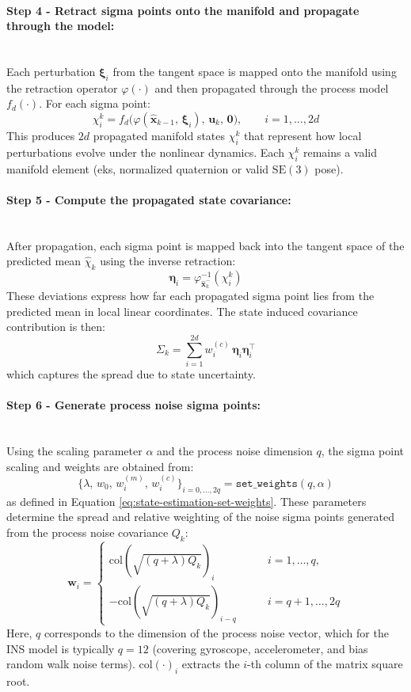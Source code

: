 \paragraph{Step 4 - Retract sigma points onto the manifold and propagate through the model:} \mbox{}\\[0.5em] \noindent
Each perturbation $\boldsymbol{\xi}_i$ from the tangent space is mapped onto the manifold using the retraction operator $\varphi(\cdot)$ and then propagated through the process model $f_d(\cdot)$. For each sigma point:
$$
    \chi_i^{k} = f_d\big(\varphi(\hat{\mathbf{x}}_{k-1},\, \boldsymbol{\xi}_i),\, \mathbf{u}_k,\, \mathbf{0}\big),\qquad i = 1,\ldots,2d
$$
This produces $2d$ propagated manifold states $\chi_i^k$ that represent how local perturbations evolve under the nonlinear dynamics. Each $\chi_i^k$ remains a valid manifold element (eks, normalized quaternion or valid $\mathrm{SE}(3)$ pose).

\paragraph{Step 5 - Compute the propagated state covariance:} \mbox{}\\[0.5em] \noindent
After propagation, each sigma point is mapped back into the tangent space of the predicted mean $\hat{\chi}_k$ using the inverse retraction:
$$
    \boldsymbol{\eta}_i = \varphi^{-1}_{\hat{\mathbf{x}}_{k}^{-}}(\chi_i^k)
$$
These deviations express how far each propagated sigma point lies from the predicted mean in local linear coordinates. The state induced covariance contribution is then:
$$
    \Sigma_k = \sum_{i=1}^{2d} w_i^{(c)}\, \boldsymbol{\eta}_i \boldsymbol{\eta}_i^\top
$$
which captures the spread due to state uncertainty.

\paragraph{Step 6 - Generate process noise sigma points:} \mbox{}\\[0.5em] \noindent
Using the scaling parameter $\alpha$ and the process noise dimension $q$, the sigma point scaling and weights are obtained from:
$$
    \{\lambda,\, w_0,\, w_i^{(m)},\, w_i^{(c)}\}_{i=0,\ldots,2q} = \mathtt{set\_weights}(q, \alpha)
$$
as defined in Equation \ref{eq:state-estimation-set-weights}. These parameters determine the spread and relative weighting of the noise sigma points generated from the process noise covariance $Q_k$:
$$
    \mathbf{w}_i = 
    \begin{cases}
        \text{col}\left(\sqrt{(q+\lambda)Q_k}\right)_i \qquad &i = 1,\ldots,q, \\
        -\text{col}\left(\sqrt{(q+\lambda)Q_k}\right)_{i-q} \qquad &i = q+1,\ldots,2q
    \end{cases}
$$
Here, $q$ corresponds to the dimension of the process noise vector, which for the INS model is typically $q=12$ (covering gyroscope, accelerometer, and bias random walk noise terms). $\text{col}(\cdot)_i$ extracts the $i$-th column of the matrix square root.

